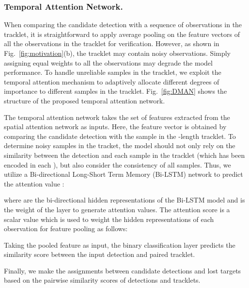 \documentclass[runningheads]{llncs}
\begin{document}
  \subsubsection{Temporal Attention Network.}
  When comparing the candidate detection with a sequence of observations in the tracklet, it is straightforward to apply average pooling on the feature vectors of all the observations in the tracklet for verification. However, as shown in Fig.~\ref{fig:motivation}(b), the tracklet may contain noisy observations. 
Simply assigning equal weights to all the observations may degrade the model performance. 
To handle unreliable samples in the tracklet, we exploit the temporal attention mechanism to adaptively allocate different degrees of importance to different samples in the tracklet. Fig.~\ref{fig:DMAN} shows the structure of the proposed temporal attention network.
  
  The temporal attention network takes the set of features   extracted from the spatial attention network as inputs. Here, the feature vector  is obtained by comparing the candidate detection with the  sample in the -length tracklet.
To determine noisy samples in the tracket, the model should not only rely on the similarity between the detection and each sample in the tracklet (which has been encoded in each ), but also consider the consistency of all samples. Thus, we utilize a Bi-directional Long-Short Term Memory (Bi-LSTM) network to predict the attention value :
  
  where  are the bi-directional hidden representations of the Bi-LSTM model and  is the weight of the layer to generate attention values. The attention score  is a scalar value which is used to weight the hidden representations  of each observation for feature pooling as follows:
  
  Taking the pooled feature  as input, the binary classification layer predicts the similarity score between the input detection and paired tracklet.
  
  Finally, we make the assignments between candidate detections and lost targets based on the pairwise similarity scores of detections and tracklets.
  
\end{document}
